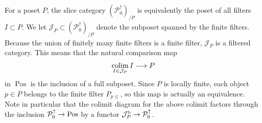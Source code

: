 \documentclass[10pt]{amsart}
\numberwithin{equation}{section}
\theoremstyle{definition}
\DeclareMathOperator{\Pos}{Pos}
\DeclareMathOperator*{\colim}{colim}
\newcommand{\cJ}{\mathcal{J}}
\newcommand{\cP}{\mathcal{P}}
\renewcommand{\to}{\mathchoice{\longrightarrow}{\rightarrow}{}{}}
\begin{document}
For a poset $P$, the slice category $(\cP^{\uparrow}_{0})_{/P}$ is equivalently the poset of all filters $I\subset P$.
We let $\cJ_{P} \subset (\cP^{\uparrow}_{0})_{/P}$ denote the subposet spanned by the finite filters.
Because the union of finitely many finite filters is a finite filter, $\cJ_{P}$ is a filtered category.
This means that the natural comparison map
\begin{align*}
	\colim_{I\in \cJ_{P}} I \to P
\end{align*}
in $\Pos$ is the inclusion of a full subposet.
Since $P$ is locally finite, each object $p\in P$ belongs to the finite filter $P_{p\leq}$, so this map is actually an equivalence.
Note in particular that the colimit diagram for the above colimit factors through the inclusion $\cP^{\uparrow}_{0}\to \Pos$ by a functor $\cJ_{P}^{\triangleright} \to \cP^{\uparrow}_{0}$.
\end{document}
